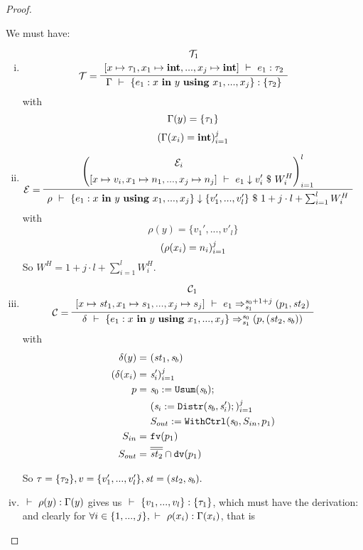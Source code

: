 \begin{proof}
\begin{itemize}
\def\lunit{\vrange{()_1}{()_l}} 
\def\stwo{\< \F_1,..., \F_l, \T \'>}
\def\sgmszs{\sgm[\s_0 \|-> \lunit, \st_2 \>-> \sgm''(\st_2)]}
\def\sgmsz{\sgm[\s_0 \|-> \lunit]}

		We must have: 
		\begin{enumerate}[(i)]
		\item 
		$$\PT{
			\UCN{\MT_1}{\Type{ [x \|-> {\tau_1}, x_1 \|-> \int,...,x_j \|-> \int ]}{e_1}{\tau_2}}
			\LeLa{\MT = }
			\UC{\Type{\Gam}{\Comp{e_1}{x}{y}{\usevars}}{\tseq{\tau_2}}}
		} $$
	    with $$\Gamma(y)=\{\tau_1\}$$
	        $$(\Gamma(x_i) = \mathbf{int})^j_{i=1}$$
		
		\item
		\[\PT{
			\AC{\left(
				\begin{aligned}
					&\ME_i \\
					\Eval{[x \|-> {v_i}, x_1 \|-> n_1,...& , x_j \|-> n_j]}{e_1}{v_i'}{W^H_i}
				\end{aligned}\right)^l_{i=1}}
			\LeLa{\ME = }
			\UC{\Eval{\rho}{\Comp{e_1}{x}{y}{\usevars}}{\{v_1',...,v'_l\}}
			      {1+ j \cdot l + \sum_{i=1}^{l}W^H_i }}
		}\]
	    with $$\rho(y)=\{v_1',...,v'_l\} $$
	    \[(\rho(x_i) = n_i)^j_{i=1}\]
		So $W^H = 1+ j \cdot l + \sum_{i=1}^{l}W^H_i $.
		
		\item 
		\[\PT{
			\UCN{\MC_1}{\Trans{[x \|-> {\st_1}, x_1 \|-> s_1,...,x_j \|-> s_j]}{e_1}{\s_0+1+j}{\s_1}{\sfun{p_1}{\st_2}}}
			\LeLa{\MC = }
			\UC{\Trans{\del}{\Comp{e_1}{x}{y}{\usevars}}{\s_0}{\s_1}
				{\sfun{p}{(\st_2,\s_b)}}}
		}\]
	    with
	    	\begin{align*}
	    		\delta(y) = &  \ (\mathit{st}_1,\mathit{s}_b) \\
	    		(\delta(x_i) = & \ \mathit{s}_i')^j_{i=1} \\
	    		p = & \ \mathit{s}_0 := \mathtt{Usum}(\mathit{s}_b); \\
	    		& \ (\mathit{s}_i := \mathtt{Distr}(\mathit{s}_b,\mathit{s}_i');)^j_{i=1} \\
	    		& \ S_{out} := \mathtt{WithCtrl}(\mathit{s}_0,S_{in},p_1) \\
	    		S_{in} = &  \ \mathtt{fv}(p_1) \\
	    		S_{out} = & \ \overline{\overline{\mathit{st}_2}} \cap \mathtt{dv}(p_1) 
	    	\end{align*}
	
	 So $\tau = \{\tau_2\}, v = \{ v'_1,...,v'_l \}, \mathit{st} = (\mathit{st}_2,\mathit{s}_b). $ \\

	\item $\ \vdash\  \rho(y) : \Gamma(y)$ gives us $\ \vdash\  \{ v_1,...,v_l \} : \{\tau_1\}$, 
	which must have the derivation:
	and clearly for $\forall i \in \{1,...,j\}, \ \vdash\  \rho(x_i) : \Gamma(x_i)$, that is 
	

\end{enumerate}
\end{itemize}
\end{proof}

